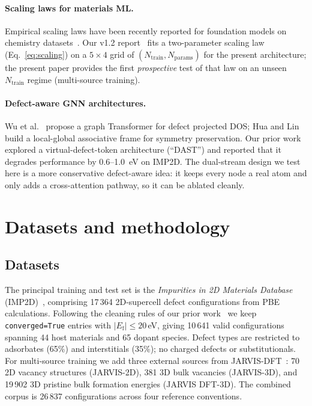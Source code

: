 \documentclass[11pt,a4paper]{article}
\begin{document}
\paragraph{Scaling laws for materials ML.}
Empirical scaling laws have been recently reported for foundation
models on chemistry datasets~\cite{Reiser2022GNN4Mater}. Our v1.2
report~\cite{ourPaperV12} fits a two-parameter scaling law
(Eq.~\ref{eq:scaling}) on a $5 \times 4$ grid of
$(N_{\mathrm{train}}, N_{\mathrm{params}})$ for the present
architecture; the present paper provides the first \emph{prospective}
test of that law on an unseen $N_{\mathrm{train}}$ regime
(multi-source training).

\paragraph{Defect-aware GNN architectures.}
Wu et al.~\cite{Wu2025DefectGT} propose a graph Transformer for
defect projected DOS; Hua and Lin~\cite{Hua2025SPFrame} build a
local-global associative frame for symmetry preservation. Our prior
work~\cite{ourPaperV12} explored a virtual-defect-token architecture
(``DAST'') and reported that it degrades performance by 0.6--1.0~eV
on IMP2D. The dual-stream design we test here is a more conservative
defect-aware idea: it keeps every node a real atom and only adds a
cross-attention pathway, so it can be ablated cleanly.

\section{Datasets and methodology}\label{sec:data}

\subsection{Datasets}
The principal training and test set is the \textit{Impurities in 2D
Materials Database} (IMP2D)~\cite{CMR}, comprising 17\,364
2D-supercell defect configurations from PBE calculations. Following
the cleaning rules of our prior work~\cite{ourPaperV12} we keep
\texttt{converged=True} entries with $|E_{\mathrm{f}}| \le 20$\,eV,
giving 10\,641 valid configurations spanning 44 host materials and
65 dopant species. Defect types are restricted to adsorbates (65\%)
and interstitials (35\%); no charged defects or substitutionals.
For multi-source training we add three external sources from
JARVIS-DFT~\cite{JARVIS}: 70 2D vacancy structures (JARVIS-2D), 381
3D bulk vacancies (JARVIS-3D), and 19\,902 3D pristine bulk
formation energies (JARVIS DFT-3D). The combined corpus is 26\,837
configurations across four reference conventions.
\end{document}
